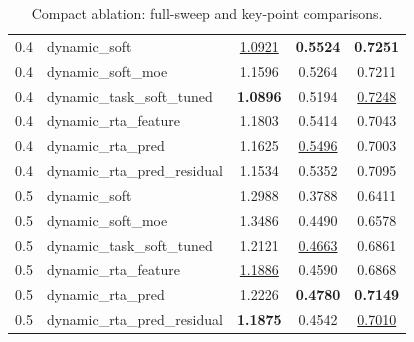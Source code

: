 \begin{table}[t]
\begin{tabular}{c l c c c}
\midrule
0.4 & dynamic_soft & \underline{1.0921} & \textbf{0.5524} & \textbf{0.7251} \\ 
0.4 & dynamic_soft_moe & 1.1596 & 0.5264 & 0.7211 \\ 
0.4 & dynamic_task_soft_tuned & \textbf{1.0896} & 0.5194 & \underline{0.7248} \\ 
0.4 & dynamic_rta_feature & 1.1803 & 0.5414 & 0.7043 \\ 
0.4 & dynamic_rta_pred & 1.1625 & \underline{0.5496} & 0.7003 \\ 
0.4 & dynamic_rta_pred_residual & 1.1534 & 0.5352 & 0.7095 \\ 
0.5 & dynamic_soft & 1.2988 & 0.3788 & 0.6411 \\ 
0.5 & dynamic_soft_moe & 1.3486 & 0.4490 & 0.6578 \\ 
0.5 & dynamic_task_soft_tuned & 1.2121 & \underline{0.4663} & 0.6861 \\ 
0.5 & dynamic_rta_feature & \underline{1.1886} & 0.4590 & 0.6868 \\ 
0.5 & dynamic_rta_pred & 1.2226 & \textbf{0.4780} & \textbf{0.7149} \\ 
0.5 & dynamic_rta_pred_residual & \textbf{1.1875} & 0.4542 & \underline{0.7010} \\ 
\bottomrule
\end{tabular}
\caption{Compact ablation: full-sweep and key-point comparisons.}\label{tab:residual_ablation_compact}
\end{table}
